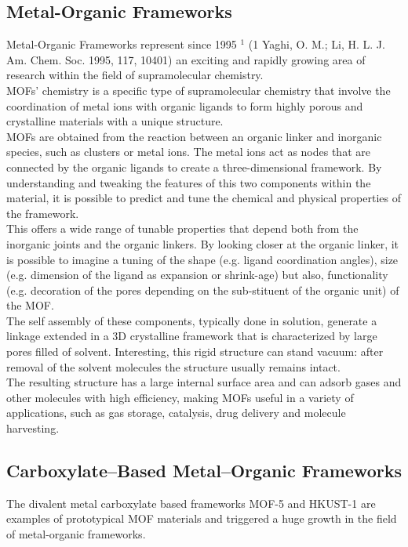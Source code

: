 \documentclass[../Master.tex]{subfiles}
\begin{document}
\subsection{Metal-Organic Frameworks}\label{subsec:mof}
Metal-Organic Frameworks represent since 1995 $^{1}$ (1 Yaghi, O. M.; Li, H. L. J. Am. Chem. Soc. 1995, 117, 10401) an exciting and rapidly growing area of research within the field of supramolecular chemistry.\\
MOFs' chemistry is a specific type of supramolecular chemistry that involve the coordination of metal ions with organic ligands to form highly porous and crystalline materials with a unique structure. \\
MOFs are obtained from the reaction between an organic linker and inorganic species, such as clusters or metal ions. The metal ions act as nodes that are connected by the organic ligands to create a three-dimensional framework. By understanding and tweaking the features of this two components within the material, it is possible to predict and tune the chemical and physical properties of the framework. \\
This offers a wide range of tunable properties that depend both from the inorganic joints and the organic linkers. By looking closer at the organic linker, it is possible to imagine a tuning of the shape (e.g. ligand coordination angles), size (e.g. dimension of the ligand as expansion or shrink-age) but also, functionality (e.g. decoration of the pores depending on the sub-stituent of the organic unit) of the MOF. \\
The self assembly of these components, typically done in solution, generate a linkage extended in a 3D crystalline framework that is characterized by large pores filled of solvent. Interesting, this rigid structure can stand vacuum: after removal of the solvent molecules the structure usually remains intact. \\
The resulting structure has a large internal surface area and can adsorb gases and other molecules with high efficiency, making MOFs useful in a variety of applications, such as gas storage, catalysis, drug delivery and molecule harvesting.

\subsection{Carboxylate–Based Metal–Organic Frameworks}\label{cb-mof}
The divalent metal carboxylate based frameworks MOF-5 and HKUST-1 are examples of prototypical MOF materials and triggered a huge growth in the field of metal-organic frameworks.
\end{document}
